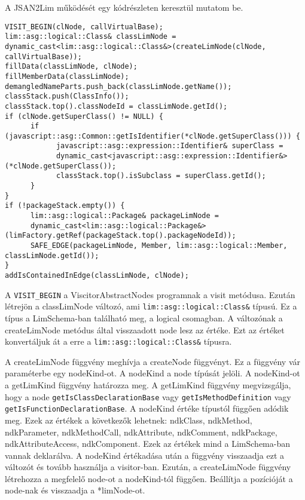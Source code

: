 A JSAN2Lim működését egy kódrészleten keresztül mutatom be.
\begin{lstlisting}[caption={ClassDeclaration Visitor}, label={lst:classdeclaration_visitor}, language={CStyle}, basicstyle=\fontsize{9}{9}\selectfont\ttfamily]
VISIT_BEGIN(clNode, callVirtualBase);
lim::asg::logical::Class& classLimNode = dynamic_cast<lim::asg::logical::Class&>(createLimNode(clNode, callVirtualBase));
fillData(classLimNode, clNode);
fillMemberData(classLimNode);
demangledNameParts.push_back(classLimNode.getName());
classStack.push(ClassInfo());
classStack.top().classNodeId = classLimNode.getId();
if (clNode.getSuperClass() != NULL) {
      if (javascript::asg::Common::getIsIdentifier(*clNode.getSuperClass())) {
            javascript::asg::expression::Identifier& superClass =
            dynamic_cast<javascript::asg::expression::Identifier&>(*clNode.getSuperClass());
            classStack.top().isSubclass = superClass.getId();
      }
}
if (!packageStack.empty()) {
      lim::asg::logical::Package& packageLimNode =
      dynamic_cast<lim::asg::logical::Package&>(limFactory.getRef(packageStack.top().packageNodeId));
      SAFE_EDGE(packageLimNode, Member, lim::asg::logical::Member, classLimNode.getId());
}
addIsContainedInEdge(classLimNode, clNode);
\end{lstlisting}

A \texttt{VISIT\_BEGIN} a ViscitorAbstractNodes programnak a visit metódusa.
Ezután létrejön a classLimNode változó, ami \texttt{lim::asg::logical::Class\&} típusú.
Ez a típus a LimSchema-ban található meg, a logical csomagban.
A változónak a createLimNode metódus által visszaadott node lesz az értéke.
Ezt az értéket konvertáljuk át a erre a \texttt{lim::asg::logical::Class\&} típusra.


A createLimNode függvény meghívja a createNode függvényt. Ez a függvény vár paraméterbe egy nodeKind-ot.
A nodeKind a node típúsát jelöli.
A nodeKind-ot a getLimKind függvény határozza meg.
A getLimKind függvény megvizsgálja, hogy a node \texttt{getIsClassDeclarationBase} vagy \texttt{getIsMethodDefinition} vagy \texttt{getIsFunctionDeclarationBase}.
A nodeKind értéke típustól függően adódik meg.
Ezek az értékek a következők lehetnek: ndkClass, ndkMethod, ndkParameter, ndkMethodCall, ndkAttribute, ndkComment, ndkPackage, ndkAttributeAccess, ndkComponent.
Ezek az értékek mind a LimSchema-ban vannak deklarálva. A nodeKind értékadása után a függvény visszaadja ezt a változót és tovább használja a visitor-ban.
Ezután, a createLimNode függvény létrehozza a megfelelő node-ot a nodeKind-tól függően. Beállítja a pozícióját a node-nak és visszaadja a *limNode-ot.


